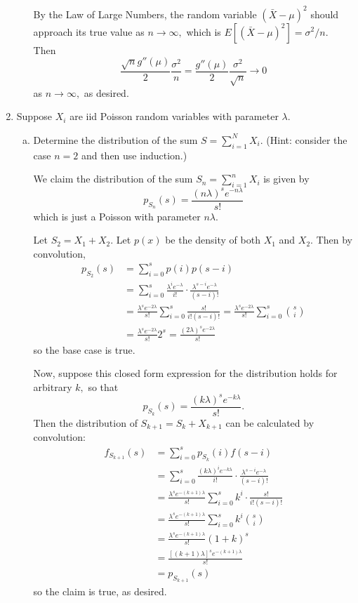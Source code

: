 \documentclass{article}
\begin{document}
\begin{enumerate}
\begin{enumerate}[(a)]
				\begin{soln}
					By the Law of Large Numbers, the random variable $(\bar{X}-\mu)^2$ should approach its true value as $n\to\infty,$ which is $E[(\bar{X}-\mu)^2]=\sigma^2/n.$ Then \[\frac{\sqrt{n}g''(\mu)}{2}\frac{\sigma^2}{n}=\frac{g''(\mu)}{2}\frac{\sigma^2}{\sqrt{n}} \to 0\] as $n\to \infty,$ as desired.
					
				\end{soln}
		\end{enumerate}

		\newpage
	\item Suppose $X_i$ are iid Poisson random variables with parameter $\lambda.$
		\begin{enumerate}[(a)]
			\item Determine the distribution of the sum $S=\displaystyle\sum_{i=1}^{N}X_i.$ (Hint: consider the case $n=2$ and then use induction.)
				\begin{soln}
					We claim the distribution of the sum $S_n=\displaystyle\sum_{i=1}^{n} X_i$ is given by \[p_{S_n}(s) = \frac{(n\lambda)^s e^{-n\lambda}}{s!}\] which is just a Poisson with parameter $n\lambda.$

					Let $S_2=X_1+X_2.$ Let $p(x)$ be the density of both $X_1$ and $X_2.$ Then by convolution, 
					\begin{align*}
						p_{S_2}(s) &= \sum_{i=0}^{s}p(i)p(s-i) \\
						&= \sum_{i=0}^{s} \frac{\lambda^i e^{-\lambda}}{i!}\cdot\frac{\lambda^{s-i} e^{-\lambda}}{(s-i)!} \\
						&= \frac{\lambda^s e^{-2\lambda}}{s!}\sum_{i=0}^{s}\frac{s!}{i!(s-i)!} = \frac{\lambda^s e^{-2\lambda}}{s!}\sum_{i=0}^{s}\binom{s}{i} \\
						&= \frac{\lambda^s e^{-2\lambda}}{s!} 2^s = \frac{(2\lambda)^s e^{-2\lambda}}{s!}
					\end{align*} so the base case is true.

					Now, suppose this closed form expression for the distribution holds for arbitrary $k,$ so that \[p_{S_k}(s) = \frac{(k\lambda)^s e^{-k\lambda}}{s!}. \] Then the distribution of $S_{k+1}=S_k+X_{k+1}$ can be calculated by convolution:
					\begin{align*}
						f_{S_{k+1}}(s) &= \sum_{i=0}^{s}p_{S_k}(i) f(s-i) \\
						&= \sum_{i=0}^{s} \frac{(k\lambda)^i e^{-k\lambda}}{i!} \cdot \frac{\lambda^{s-i} e^{-\lambda}}{(s-i)!}\\
						&= \frac{\lambda^s e^{-(k+1)\lambda}}{s!} \sum_{i=0}^{s} k^i\cdot\frac{s!}{i!(s-i)!} \\
						&= \frac{\lambda^s e^{-(k+1)\lambda}}{s!}\sum_{i=0}^{s}k^i\binom{s}{i} \\
						&= \frac{\lambda^s e^{-(k+1)\lambda}}{s!} (1+k)^s \\
						&= \frac{[(k+1)\lambda]^s e^{-(k+1)\lambda}}{s!} \\
						&= p_{S_{k+1}}(s)
					\end{align*} so the claim is true, as desired.


\end{soln}
\end{enumerate}
\end{enumerate}
\end{document}
